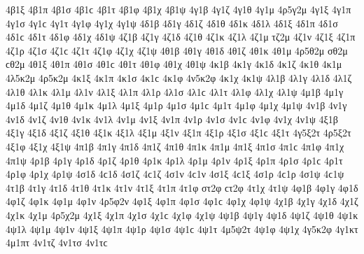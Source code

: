 {4β1ξ 
4β1π 
4β1σ 4β1ϲ 
4β1τ 
4β1φ 
4β1χ 
4β1ψ 
4γ1β 
4γ1ζ 
4γ1θ 
4γ1μ 
4ρ5γ2μ   %
4γ1ξ 
4γ1π 
4γ1σ 4γ1ϲ 
4γ1τ 
4γ1φ 
4γ1χ 
4γ1ψ 
4δ1β 
4δ1γ 
4δ1ζ 
4δ1θ 
4δ1κ 
4δ1λ 
4δ1ξ 
4δ1π 
4δ1σ 4δ1ϲ 
4δ1τ 
4δ1φ 
4δ1χ 
4δ1ψ 
4ζ1β   %
4ζ1γ   %
4ζ1δ 
4ζ1θ 
4ζ1κ 
4ζ1λ 
4ζ1μ 
τζ2μ   %
4ζ1ν 
4ζ1ξ 
4ζ1π 
4ζ1ρ 
4ζ1σ 4ζ1ϲ 
4ζ1τ 
4ζ1φ 
4ζ1χ 
4ζ1ψ 
4θ1β 
4θ1γ 
4θ1δ 
4θ1ζ 
4θ1κ 
4θ1μ 
4ρ5θ2μ   %
σθ2μ ϲθ2μ   %
4θ1ξ 
4θ1π 
4θ1σ 4θ1ϲ 
4θ1τ 
4θ1φ 
4θ1χ 
4θ1ψ 
4κ1β   %
4κ1γ 
4κ1δ 
4κ1ζ 
4κ1θ 
4κ1μ 
4λ5κ2μ   %
4ρ5κ2μ   %
4κ1ξ 
4κ1π 
4κ1σ 4κ1ϲ 
4κ1φ 
4ν5κ2φ   %
4κ1χ 
4κ1ψ 
4λ1β 
4λ1γ 
4λ1δ 
4λ1ζ 
4λ1θ 
4λ1κ 
4λ1μ 
4λ1ν 
4λ1ξ 
4λ1π 
4λ1ρ 
4λ1σ 4λ1ϲ 
4λ1τ 
4λ1φ 
4λ1χ 
4λ1ψ 
4μ1β 
4μ1γ 
4μ1δ 
4μ1ζ 
4μ1θ 
4μ1κ 
4μ1λ 
4μ1ξ 
4μ1ρ 
4μ1σ 4μ1ϲ 
4μ1τ 
4μ1φ 
4μ1χ 
4μ1ψ 
4ν1β 
4ν1γ 
4ν1δ 
4ν1ζ 
4ν1θ 
4ν1κ 
4ν1λ 
4ν1μ 
4ν1ξ 
4ν1π 
4ν1ρ 
4ν1σ 4ν1ϲ 
4ν1φ 
4ν1χ 
4ν1ψ 
4ξ1β 
4ξ1γ 
4ξ1δ 
4ξ1ζ 
4ξ1θ 
4ξ1κ 
4ξ1λ 
4ξ1μ 
4ξ1ν 
4ξ1π 
4ξ1ρ 
4ξ1σ 4ξ1ϲ 
4ξ1τ 
4γ5ξ2τ   %
4ρ5ξ2τ   %
4ξ1φ 
4ξ1χ 
4ξ1ψ 
4π1β 
4π1γ 
4π1δ 
4π1ζ 
4π1θ 
4π1κ 
4π1μ 
4π1ξ 
4π1σ 4π1ϲ 
4π1φ 
4π1χ 
4π1ψ 
4ρ1β 
4ρ1γ 
4ρ1δ 
4ρ1ζ 
4ρ1θ 
4ρ1κ 
4ρ1λ 
4ρ1μ 
4ρ1ν 
4ρ1ξ 
4ρ1π 
4ρ1σ 4ρ1ϲ 
4ρ1τ 
4ρ1φ 
4ρ1χ 
4ρ1ψ 
4σ1δ 4ϲ1δ   %
4σ1ζ 4ϲ1ζ 
4σ1ν 4ϲ1ν   %
4σ1ξ 4ϲ1ξ 
4σ1ρ 4ϲ1ρ 
4σ1ψ 4ϲ1ψ 
4τ1β 
4τ1γ 
4τ1δ 
4τ1θ 
4τ1κ 
4τ1ν 
4τ1ξ 
4τ1π 
4τ1φ 
στ2φ ϲτ2φ   %
4τ1χ 
4τ1ψ 
4φ1β 
4φ1γ 
4φ1δ 
4φ1ζ 
4φ1κ   %
4φ1μ 
4φ1ν 
4ρ5φ2ν   %
4φ1ξ 
4φ1π 
4φ1σ 4φ1ϲ 
4φ1χ 
4φ1ψ 
4χ1β 
4χ1γ 
4χ1δ 
4χ1ζ 
4χ1κ 
4χ1μ 
4ρ5χ2μ   %
4χ1ξ 
4χ1π 
4χ1σ 4χ1ϲ 
4χ1φ 
4χ1ψ 
4ψ1β 
4ψ1γ 
4ψ1δ 
4ψ1ζ 
4ψ1θ 
4ψ1κ 
4ψ1λ 
4ψ1μ 
4ψ1ν 
4ψ1ξ 
4ψ1π 
4ψ1ρ 
4ψ1σ 4ψ1ϲ 
4ψ1τ 
4μ5ψ2τ   %
4ψ1φ 
4ψ1χ 
4γ5κ2φ   %
4γ1κτ   %
4μ1πτ   %
4ν1τζ   %
4ν1τσ 4ν1τϲ   %
}
